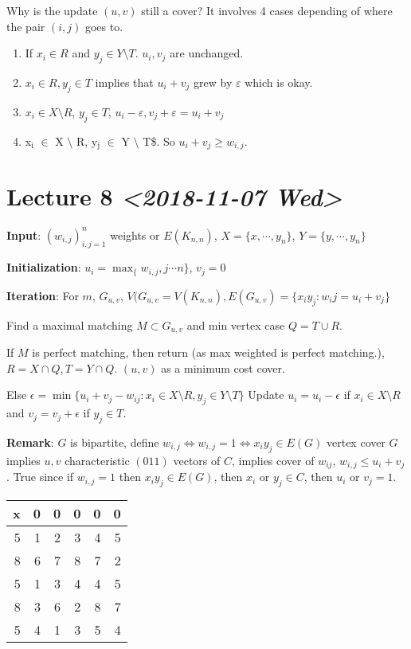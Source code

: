 \documentclass[11pt]{article}
\def\max{\operatorname{max}}
\def\min{\operatorname{min}}
\begin{document}
Why is the update \((u, v)\) still a cover? It involves 4 cases depending of
where the pair \((i, j)\) goes to.

\begin{enumerate}
\item If \(x_i \in R\) and \(y_j \in Y \setminus T\).
\(u_i, v_j\) are unchanged.
\item \(x_i \in R, y_j \in T\) implies that \(u_i + v_j\) grew by \(\varepsilon\) which
is okay.
\item \(x_i \in X \setminus R\), \(y_j \in T\), \(u_i - \varepsilon, v_j +
      \varepsilon = u_i + v_j\)
\item x\(_{\text{i}}\) \(\in\) X \(\setminus\) R, y\(_{\text{j}}\) \(\in\) Y \(\setminus\) T\$. So \(u_i + v_j \ge w_{i,
      j}\).
\end{enumerate}
\section{Lecture 8 \textit{<2018-11-07 Wed>}}
\label{sec:orgb01a839}
\textbf{Input}: \((w_{i, j})_{i, j =1}^n\) weights or \(E(K_{n, n})\), \(X = \{x, \cdots,
   y_n\}\), \(Y = \{y, \cdots, y_n\}\)

\textbf{Initialization}: \(u_i = \max_\{w_{i, j}, j\cdots n\}\), \(v_j = 0\)

\textbf{Iteration}: For \(m\), \(G_{u, v}\), \(V(G_{u, v} = V(K_{n, n}), E(G_{u, v}) =
    \{x_iy_j \colon w_ij = u_i + v_j\}\)

Find a maximal matching \(M \subset G_{u, v}\) and min vertex case \(Q = T \cup
    R\).

If \(M\) is perfect matching, then return (as max weighted is perfect
matching.), \(R = X \cap Q, T = Y \cap Q\). \((u, v)\) as a minimum cost cover.

Else \(\epsilon = \min\{u_i + v_j - w_{ij}\colon x_i \in X \setminus R, y_j
    \in Y \setminus T \}\) Update \(u_i = u_i - \epsilon\) if \(x_i \in X \setminus
    R\) and \(v_j = v_j + \epsilon\) if \(y_j \in T\).

\textbf{Remark}: \(G\) is bipartite, define \(w_{i, j} \iff w_{i, j} = 1 \iff x_iy_j
     \in E(G)\) vertex cover \(G\) implies \(u, v\) characteristic \((011)\) vectors of
 \(C\), implies cover of \(w_{ij}\), \(w_{i, j} \le u_i + v_j\). True since if
 \(w_{i, j} = 1\) then \(x_iy_j \in E(G)\), then \(x_i\) or \(y_j \in C\), then
 \(u_i\) or \(v_j =1\).

\begin{center}
\begin{tabular}{rrrrrr}
x & 0 & 0 & 0 & 0 & 0\\
\hline
5 & 1 & 2 & 3 & 4 & 5\\
8 & 6 & 7 & 8 & 7 & 2\\
5 & 1 & 3 & 4 & 4 & 5\\
8 & 3 & 6 & 2 & 8 & 7\\
5 & 4 & 1 & 3 & 5 & 4\\
\end{tabular}
\end{center}
\end{document}
